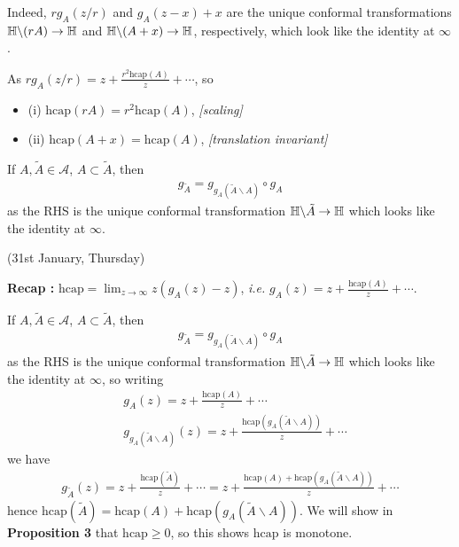 \documentclass[12pt,a4paper]{article}
\renewenvironment{i}
{\begin{itemize} 
	}%
	{\end{itemize}
}
\begin{document}
\quad Indeed, $rg_A(z/r)$ and $g_A(z-x) + x$ are the unique conformal transformations $\mathbb{H} \backslash (rA) \rightarrow \mathbb{H}$ and $\mathbb{H} \backslash (A+x) \rightarrow \mathbb{H}$, respectively, which look like the identity at $\infty$.

\quad As $rg_A(z/r) = z+ \frac{r^2 \text{hcap}(A)}{z} + \cdots$, so
\begin{i}
\item[(i)] $\text{hcap}(rA) = r^2 \text{hcap}(A)$, \emph{[scaling]}
\item[(ii)] $\text{hcap}(A+x) = \text{hcap}(A)$, \emph{[translation invariant]}
\end{i}
If $A, \tilde{A} \in \mathscr{A}$, $A\subset \tilde{A}$, then 
\begin{align*}
g_{\tilde{A}} = g_{g_A(\tilde{A} \backslash A)} \circ g_A
\end{align*}
as the RHS is the unique conformal transformation $\mathbb{H} \backslash \tilde{A} \rightarrow \mathbb{H}$ which looks like the identity at $\infty$.
\s

\newday

(31st January, Thursday)
\s

\textbf{Recap :} $\text{hcap} = \lim_{z\rightarrow \infty} z(g_A(z)-z)$, \textit{i.e.} $g_A(z) = z+ \frac{\text{hcap}(A)}{z} + \cdots$.
\s

If $A, \tilde{A} \in \mathscr{A}$, $A\subset \tilde{A}$, then 
\begin{align*}
g_{\tilde{A}} = g_{g_A(\tilde{A} \backslash A)} \circ g_A
\end{align*}
as the RHS is the unique conformal transformation $\mathbb{H} \backslash \tilde{A} \rightarrow \mathbb{H}$ which looks like the identity at $\infty$, so writing
\begin{align*}
& g_A(z) = z+ \frac{\text{hcap}(A)}{z} + \cdots \\
& g_{g_A(\tilde{A} \backslash A)} (z) = z + \frac{\text{hcap}(g_A(\tilde{A} \backslash A))}{z}+\cdots
\end{align*}
we have
\begin{align*}
g_{\tilde{A}}(z) = z+ \frac{\text{hcap}(\tilde{A})}{z} + \cdots = z+ \frac{\text{hcap}(A) + \text{hcap}(g_A(\tilde{A} \backslash A))}{z} + \cdots
\end{align*}
hence $\text{hcap}(\tilde{A}) = \text{hcap}(A) + \text{hcap}(g_A(\tilde{A}\backslash A))$. We will show in \textbf{Proposition 3} that $\text{hcap}\geq 0$, so this shows $\text{hcap}$ is monotone.
\s
\end{document}
